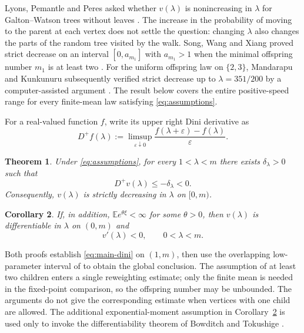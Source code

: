 \documentclass[11pt,reqno]{amsart}
\theoremstyle{plain}
\newtheorem{theorem}{Theorem}[section]
\newtheorem{corollary}[theorem]{Corollary}
\theoremstyle{definition}
\theoremstyle{remark}
\numberwithin{equation}{section}
\newcommand{\E}{\mathbb E}
\newcommand{\Dplus}{D^{+}}
\begin{document}
Lyons, Pemantle and Peres asked whether $v(\lambda)$ is nonincreasing in $\lambda$
for Galton--Watson trees without leaves \cite[Question~2.1]{LPP}.
The increase in the probability of moving to the parent at each vertex
does not settle the question: changing $\lambda$ also changes the parts of
the random tree visited by the walk. Song, Wang and Xiang proved strict
decrease on an interval $[0,a_{m_1}]$ with $a_{m_1}>1$ when the minimal
offspring number $m_1$ is at least two \cite[Theorem~1.2]{SWX}. For the
uniform offspring law on $\{2,3\}$, Mandarapu and Kunkunuru subsequently
verified strict decrease up to $\lambda=351/200$ by a computer-assisted
argument \cite[Theorem~1]{MK}. The result below covers the entire
positive-speed range for every finite-mean law satisfying
\eqref{eq:assumptions}.

For a real-valued function $f$, write its upper right Dini derivative as
\begin{equation}\label{eq:dini-def}
 \Dplus f(\lambda)
 :=\limsup_{\varepsilon\downarrow0}
       \frac{f(\lambda+\varepsilon)-f(\lambda)}{\varepsilon}.
\end{equation}

\begin{theorem}\label{thm:main}
Under \eqref{eq:assumptions}, for every $1<\lambda<m$ there exists
$\delta_\lambda>0$ such that
\begin{equation}\label{eq:main-dini}
 \Dplus v(\lambda)\le-\delta_\lambda<0.
\end{equation}
Consequently, $v(\lambda)$ is strictly decreasing in $\lambda$ on $[0,m)$.
\end{theorem}

\begin{corollary}\label{cor:derivative}
If, in addition, $\E e^{\theta\xi}<\infty$ for some $\theta>0$, then
$v(\lambda)$ is differentiable in $\lambda$ on $(0,m)$ and
\begin{equation}\label{eq:negative-derivative}
 v'(\lambda)<0,\qquad 0<\lambda<m.
\end{equation}
\end{corollary}

Both proofs establish \eqref{eq:main-dini} on $(1,m)$, then use the
overlapping low-parameter interval of \cite{SWX} to obtain the global
conclusion. The assumption of at least two children enters a single
reweighting estimate; only the finite mean is needed in the fixed-point
comparison, so the offspring number may be unbounded. The arguments do not
give the corresponding estimate when vertices with one child are allowed.
The additional exponential-moment assumption in Corollary~\ref{cor:derivative} is
used only to invoke the differentiability theorem of Bowditch and
Tokushige \cite[Theorem~1.1]{BT}.
\end{document}
